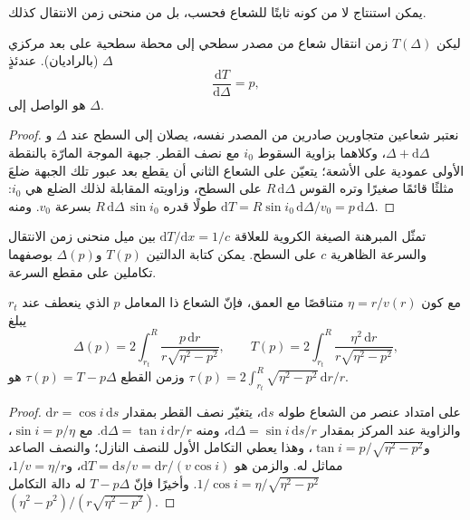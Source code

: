 يمكن استنتاج  لا من كونه ثابتًا للشعاع فحسب،
بل من منحنى زمن الانتقال كذلك.

\begin{theorem}\label{thm:b3:seismology-imaging:benndorf}
ليكن $T(\Delta)$ زمن انتقال شعاع من مصدر سطحي إلى
محطة سطحية على بعد مركزي $\Delta$ (بالراديان). عندئذٍ
\[
  \frac{\mathrm dT}{\mathrm d\Delta} = p ,
\]
هو  الواصل إلى $\Delta$.
\end{theorem}

\begin{proof}
نعتبر شعاعين متجاورين صادرين من المصدر نفسه، يصلان إلى السطح
عند $\Delta$ و$\Delta + \mathrm d\Delta$، وكلاهما بزاوية السقوط $i_0$
مع نصف القطر. جبهة الموجة المارّة بالنقطة الأولى عمودية على الأشعة؛
يتعيّن على الشعاع الثاني أن يقطع بعد عبور تلك الجبهة ضلعَ
مثلثًا قائمًا صغيرًا وتره القوس $R\,\mathrm d\Delta$ على
السطح، وزاويته المقابلة لذلك الضلع هي $i_0$: طولًا قدره
$R\,\mathrm d\Delta\,\sin i_0$ بسرعة $v_0$. ومنه
$\mathrm dT = R\sin i_0\,\mathrm d\Delta/v_0 = p\,\mathrm d\Delta$.
\end{proof}

تمثّل المبرهنة الصيغة الكروية للعلاقة $\mathrm dT/\mathrm dx = 1/c$
بين ميل منحنى زمن الانتقال والسرعة الظاهرية $c$ على
السطح. يمكن كتابة الدالتين $T(p)$ و$\Delta(p)$ بوصفهما تكاملين
على مقطع السرعة.

\begin{proposition}\label{prop:b3:seismology-imaging:integrals}
مع كون $\eta = r/v(r)$ متناقصًا مع العمق، فإنّ الشعاع ذا المعامل $p$ الذي ينعطف
عند $r_t$ يبلغ
\[
  \Delta(p) = 2\int_{r_t}^{R}\frac{p\,\mathrm dr}{r\sqrt{\eta^2 - p^2}},
  \qquad
  T(p) = 2\int_{r_t}^{R}\frac{\eta^2\,\mathrm dr}{r\sqrt{\eta^2 - p^2}},
\]
وزمن القطع $\tau(p) = T - p\Delta$ هو
$\tau(p) = 2\int_{r_t}^{R}\sqrt{\eta^2 - p^2}\,\mathrm dr/r$.
\end{proposition}

\begin{proof}
على امتداد عنصر من الشعاع طوله $\mathrm ds$، يتغيّر نصف القطر بمقدار
$\mathrm dr = \cos i\,\mathrm ds$ والزاوية عند المركز بمقدار
$\mathrm d\Delta = \sin i\,\mathrm ds/r$، ومنه $\mathrm d\Delta = \tan i\,\mathrm dr/r$.
مع $\sin i = p/\eta$، و$\tan i = p/\sqrt{\eta^2 - p^2}$، وهذا يعطي التكامل الأول
للنصف النازل؛ والنصف الصاعد مماثل له. والزمن هو
$\mathrm dT = \mathrm ds/v = \mathrm dr/(v\cos i)$، و$1/v = \eta/r$،
$1/\cos i = \eta/\sqrt{\eta^2 - p^2}$. وأخيرًا فإنّ $T - p\Delta$ له دالة التكامل
$(\eta^2 - p^2)/(r\sqrt{\eta^2 - p^2})$.
\end{proof}

